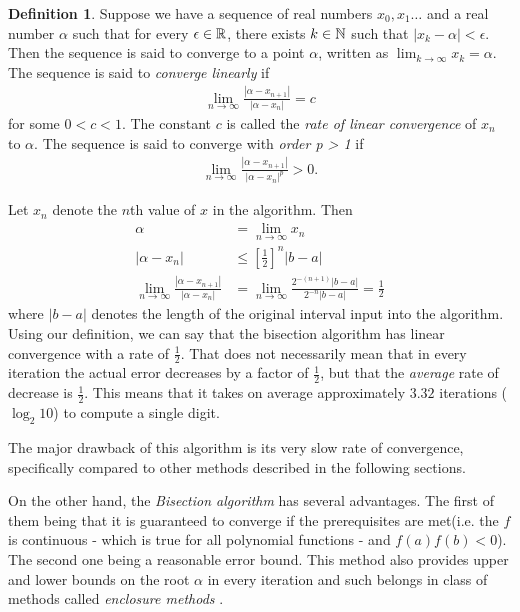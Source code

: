 \documentclass[
  digital, %
  table,   %
  nolof,     %
  nolot,     %
	draft, %
]{fithesis3}
\begin{document}
\theoremstyle{definition}
\newtheorem{definition}{Definition}

\begin{definition}
  Suppose we have a sequence of real numbers $x_{0}, x_{1}\ldots$ and a real number $\alpha$ such that for every $\epsilon\in\mathbb{R}$, there exists $k\in\mathbb{N}$ such that $\left|x_{k}-\alpha\right|<\epsilon$. Then the sequence is said to converge to a point $\alpha$, written as $\lim_{k\to\infty}x_{k}=\alpha$. The sequence is said to \textit{converge linearly} if
	\begin{align}
      \lim_{n\to\infty}\frac{|\alpha - x_{n + 1}|}{|\alpha - x_{n}|} = c 
	\end{align}
	for some $0 < c < 1$. The constant $c$ is called the \textit{rate of linear convergence} of $x_{n}$ to $\alpha$.
	The sequence is said to converge with \textit{order p > 1} if \begin{align}
      \lim_{n\to\infty}\frac{|\alpha - x_{n + 1}|}{|\alpha - x_{n}|^{p}} > 0.
	\end{align}
	\label{def:converg}
\end{definition}
Let $x_{n}$ denote the $n$th value of $x$ in the algorithm. Then 
\begin{align}
	\alpha &= \lim_{n\to\infty} x_{n} \\
	|\alpha - x_{n}| &\leq \left[\frac{1}{2}\right]^n \left|b - a\right| \\
			\lim_{n\to\infty}\frac{\left|\alpha - x_{n+1}\right|}{\left|\alpha - x_{n}\right|} &= \lim_{n\to\infty}\frac{2^{-\left(n+1\right)}\left|b - a\right|}{2^{-n}\left|b - a\right|} = \frac{1}{2}
\end{align}
where $\left|b - a\right|$ denotes the length of the original interval input into the algorithm. Using our definition, we can say that the bisection algorithm has linear convergence with a rate of $\frac{1}{2}$. That does not necessarily mean that in every iteration the actual error decreases by a factor of $\frac{1}{2}$, but that the \textit{average} rate of decrease is $\frac{1}{2}$. This means that it takes on average approximately $3.32$ iterations ($\log_2 10$) to compute a single digit.

The major drawback of this algorithm is its very slow rate of convergence, specifically compared to other methods described in the following sections.

On the other hand, the \textit{Bisection algorithm} has several advantages. The first of them being that it is guaranteed to converge if the prerequisites are met(i.e. the $f$ is continuous - which is true for all polynomial functions - and $f(a)f(b) < 0$). The second one being a reasonable error bound. This method also provides upper and lower bounds on the root $\alpha$ in every iteration and such belongs in class of methods called \textit{enclosure methods} \parencite{rootApproxMeth}.
\end{document}
